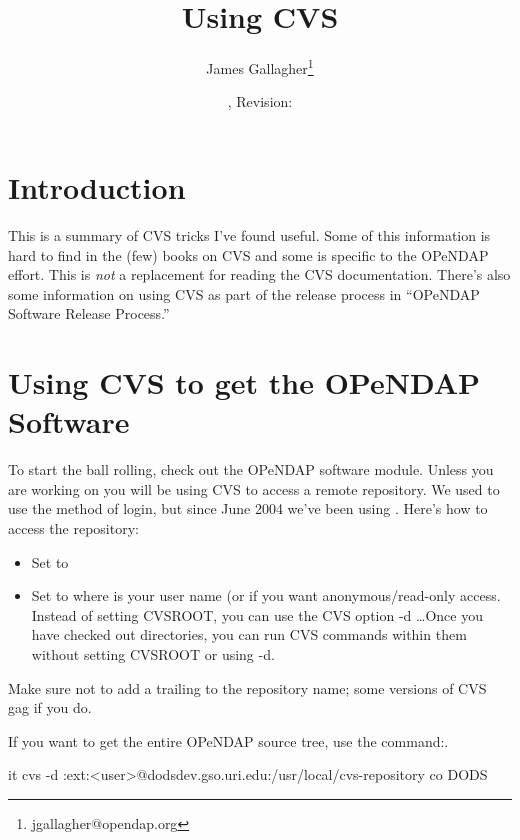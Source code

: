 \documentclass{dods-paper}
\title{Using CVS}
\author{James Gallagher\thanks{jgallagher@opendap.org}}
\date{\rcsInfoDate, Revision: \rcsInfoRevision}
\begin{document}
\maketitle

\T\tableofcontents

\section{Introduction}

This is a summary of CVS tricks I've found useful. Some of this information
is hard to find in the (few) books on CVS and some is specific to the OPeNDAP
effort. This is \emph{not} a replacement for reading
the CVS documentation. There's also some information on using CVS as part of
the release process in ``OPeNDAP Software Release Process.''

\section{Using CVS to get the OPeNDAP Software}

To start the ball rolling, check out the OPeNDAP software module. Unless you
are working on  you will be using CVS to access a
remote repository. We used to use the  method of login, but
since June 2004 we've been using . Here's how to access the
repository:

\begin{itemize}
\item Set  to 
\item Set  to
   where
   is your user name (or  if you want
  anonymous/read-only access. Instead of setting CVSROOT, you can use the CVS
  option -d \ldots Once you have checked out
  directories, you can run CVS commands within them without setting CVSROOT
  or using -d.
\end{itemize}

Make sure not to add a trailing \lit{/} to the repository name; some
versions of CVS gag if you do.

If you want to get the entire OPeNDAP source tree, use the command:.

\begin{vcode}{it}
cvs -d :ext:<user>@dodsdev.gso.uri.edu:/usr/local/cvs-repository co DODS
\end{vcode}
\end{document}
